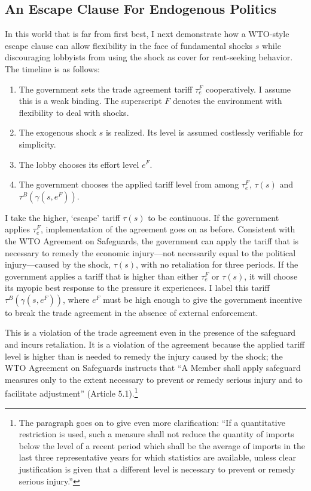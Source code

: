 \documentclass[12pt]{article}
\newcommand{\ga}{\gamma}
\begin{document}
\subsection{An Escape Clause For Endogenous Politics}
\label{sec:ECendog}
In this world that is far from first best, I next demonstrate how a WTO-style escape clause can allow flexibility in the face of fundamental shocks $s$ while discouraging lobbyists from using the shock as cover for rent-seeking behavior. The timeline is as follows:
\begin{enumerate}
	\item The government sets the trade agreement tariff $\tau_e^F$ cooperatively. I assume this is a weak binding. The superscript $F$ denotes the environment with flexibility to deal with shocks.
	\item The exogenous shock $s$ is realized. Its level is assumed costlessly verifiable for simplicity.
	\item The lobby chooses its effort level $e^F$.
	\item The government chooses the applied tariff level from among $\tau_e^F$, $\tau(s)$ and $\tau^B(\ga(s,e^F))$.
\end{enumerate}
I take the higher, `escape' tariff $\tau(s)$ to be continuous. If the government applies $\tau_e^F$, implementation of the agreement goes on as before. Consistent with the WTO Agreement on Safeguards, the government can apply the tariff that is necessary to remedy the economic injury---not necessarily equal to the political injury---caused by the shock, $\tau(s)$, with no retaliation for three periods. If the government applies a tariff that is higher than either $\tau_e^F$ or $\tau(s)$, it will choose its myopic best response to the pressure it experiences. I label this tariff $\tau^B(\ga(s,e^F))$, where $e^F$ must be high enough to give the government incentive to break the trade agreement in the absence of external enforcement.

This is a violation of the trade agreement even in the presence of the safeguard and incurs retaliation. It is a violation of the agreement because the applied tariff level is higher than is needed to remedy the injury caused by the shock; the WTO Agreement on Safeguards instructs that ``A Member shall apply safeguard measures only to the extent necessary to prevent or remedy serious injury and to facilitate adjustment'' (Article 5.1).\footnote{The paragraph goes on to give even more clarification: ``If a quantitative restriction is used, such a measure shall  not reduce the quantity of imports below the level of a recent period which shall be the average of imports in the last three representative years for which statistics are available, unless clear justification is given that a different level is necessary to prevent or remedy serious injury.''}
\end{document}
